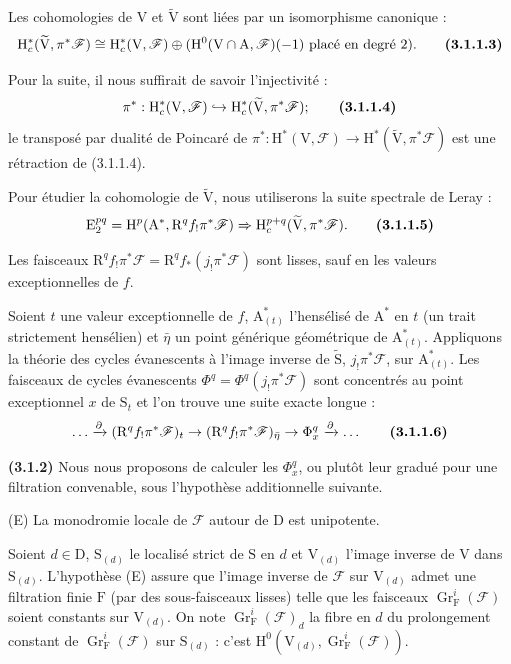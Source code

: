 \documentclass[11pt,leqno]{article}
\begin{document}
Les cohomologies de \(\mathrm V\) et \(\widetilde{\mathrm V}\) sont liées par un isomorphisme canonique :
\[
\mathrm H_c^*(\widetilde{\mathrm V},\pi^*\mathscr F)
\cong
\mathrm H_c^*(\mathrm V,\mathscr F)
\oplus
(\mathrm H^0(\mathrm V\cap\mathrm A,\mathscr F)(-1)
 \text{ placé en degré }2).
\tag*{\textbf{(3.1.1.3)}}
\]

Pour la suite, il nous suffirait de savoir l’injectivité :
\[
\pi^*:\mathrm H_c^*(\mathrm V,\mathscr F)
\hookrightarrow
\mathrm H_c^*(\widetilde{\mathrm V},\pi^*\mathscr F);
\tag*{\textbf{(3.1.1.4)}}
\]
le transposé par dualité de Poincaré de \(\pi^*:\mathrm H^*(\mathrm V,\mathscr F)\to\mathrm H^*(\widetilde{\mathrm V},\pi^*\mathscr F)\) est une rétraction de (3.1.1.4).

Pour étudier la cohomologie de \(\widetilde{\mathrm V}\), nous utiliserons la suite spectrale de Leray :
\[
\mathrm E_2^{pq}
=\mathrm H^p(\mathrm A^*,\mathrm R^qf_!\pi^*\mathscr F)
\Rightarrow
\mathrm H_c^{p+q}(\widetilde{\mathrm V},\pi^*\mathscr F).
\tag*{\textbf{(3.1.1.5)}}
\]

Les faisceaux \(\mathrm R^qf_!\pi^*\mathscr F=\mathrm R^qf_*(j_!\pi^*\mathscr F)\) sont lisses, sauf en les valeurs exceptionnelles de \(f\).

Soient \(t\) une valeur exceptionnelle de \(f\), \(\mathrm A^*_{(t)}\) l’hensélisé de \(\mathrm A^*\) en \(t\) (un trait strictement hensélien) et \(\bar{\eta}\) un point générique géométrique de \(\mathrm A^*_{(t)}\). Appliquons la théorie des cycles évanescents à l’image inverse de \(\widetilde{\mathrm S}\), \(j_!\pi^*\mathscr F\), sur \(\mathrm A^*_{(t)}\). Les faisceaux de cycles évanescents \(\Phi^q=\Phi^q(j_!\pi^*\mathscr F)\) sont concentrés au point exceptionnel \(x\) de \(\mathrm S_t\) et l’on trouve une suite exacte longue :
\[
\ldots\xrightarrow{\partial}
(\mathrm R^qf_!\pi^*\mathscr F)_t
\to
(\mathrm R^qf_!\pi^*\mathscr F)_{\bar{\eta}}
\to\Phi_x^q\xrightarrow{\partial}\ldots
\tag*{\textbf{(3.1.1.6)}}
\]

\textbf{(3.1.2)} Nous nous proposons de calculer les \(\Phi_x^q\), ou plutôt leur gradué pour une filtration convenable, sous l’hypothèse additionnelle suivante.

(E) La monodromie locale de \(\mathscr F\) autour de \(\mathrm D\) est unipotente.

Soient \(d\in\mathrm D\), \(\mathrm S_{(d)}\) le localisé strict de \(\mathrm S\) en \(d\) et \(\mathrm V_{(d)}\) l’image inverse de \(\mathrm V\) dans \(\mathrm S_{(d)}\). L’hypothèse (E) assure que l’image inverse de \(\mathscr F\) sur \(\mathrm V_{(d)}\) admet une filtration finie \(\mathrm F\) (par des sous-faisceaux lisses) telle que les faisceaux \(\operatorname{Gr}_{\mathrm F}^i(\mathscr F)\) soient constants sur \(\mathrm V_{(d)}\). On note \(\operatorname{Gr}_{\mathrm F}^i(\mathscr F)_d\) la fibre en \(d\) du prolongement constant de \(\operatorname{Gr}_{\mathrm F}^i(\mathscr F)\) sur \(\mathrm S_{(d)}\) : c’est \(\mathrm H^0(\mathrm V_{(d)},\operatorname{Gr}_{\mathrm F}^i(\mathscr F))\).
\end{document}
